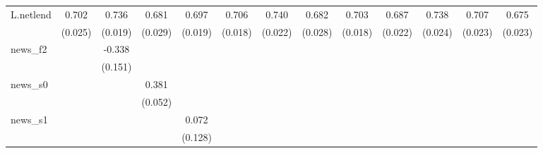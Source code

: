 {\begin{tabular}{l*{12}{c}}
\addlinespace
L.netlend   &       0.702\sym{***}&       0.736\sym{***}&       0.681\sym{***}&       0.697\sym{***}&       0.706\sym{***}&       0.740\sym{***}&       0.682\sym{***}&       0.703\sym{***}&       0.687\sym{***}&       0.738\sym{***}&       0.707\sym{***}&       0.675\sym{***}\\
            &     (0.025)         &     (0.019)         &     (0.029)         &     (0.019)         &     (0.018)         &     (0.022)         &     (0.028)         &     (0.018)         &     (0.022)         &     (0.024)         &     (0.023)         &     (0.023)         \\
\addlinespace
news\_f2     &                     &      -0.338\sym{**} &                     &                     &                     &                     &                     &                     &                     &                     &                     &                     \\
            &                     &     (0.151)         &                     &                     &                     &                     &                     &                     &                     &                     &                     &                     \\
\addlinespace
news\_s0     &                     &                     &       0.381\sym{***}&                     &                     &                     &                     &                     &                     &                     &                     &                     \\
            &                     &                     &     (0.052)         &                     &                     &                     &                     &                     &                     &                     &                     &                     \\
\addlinespace
news\_s1     &                     &                     &                     &       0.072         &                     &                     &                     &                     &                     &                     &                     &                     \\
            &                     &                     &                     &     (0.128)         &                     &                     &                     &                     &                     &                     &                     &                     \\

\end{tabular}}

